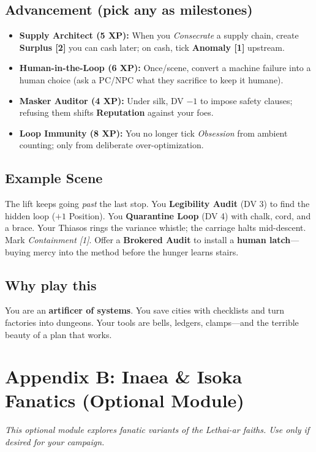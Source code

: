 \documentclass[11pt]{article}
\begin{document}
\subsection*{Advancement (pick any as milestones)}
\begin{itemize}[leftmargin=*]
  \item \textbf{Supply Architect (5 XP):} When you \emph{Consecrate} a supply chain, create \textbf{Surplus [2]} you can cash later; on cash, tick \textbf{Anomaly [1]} upstream.
  \item \textbf{Human-in-the-Loop (6 XP):} Once/scene, convert a machine failure into a human choice (ask a PC/NPC what they sacrifice to keep it humane).
  \item \quad \textbf{Masker Auditor (4 XP):} Under silk, DV \(-1\) to impose safety clauses; refusing them shifts \textbf{Reputation} against your foes.
  \item \textbf{Loop Immunity (8 XP):} You no longer tick \emph{Obsession} from ambient counting; only from deliberate over-optimization.
\end{itemize}

\subsection*{Example Scene}
The lift keeps going \emph{past} the last stop. You \textbf{Legibility Audit} (DV 3) to find the hidden loop (\(+1\) Position). You \textbf{Quarantine Loop} (DV 4) with chalk, cord, and a brace. Your Thiasos rings the variance whistle; the carriage halts mid-descent. Mark \emph{Containment [1]}. Offer a \textbf{Brokered Audit} to install a \textbf{human latch}---buying mercy into the method before the hunger learns stairs.

\subsection*{Why play this}
You are an \textbf{artificer of systems}. You save cities with checklists and turn factories into dungeons. Your tools are bells, ledgers, clamps---and the terrible beauty of a plan that works.

\section{Appendix B: Inaea \& Isoka Fanatics (Optional Module)}
\textit{This optional module explores fanatic variants of the Lethai-ar faiths. Use only if desired for your campaign.}
\end{document}

